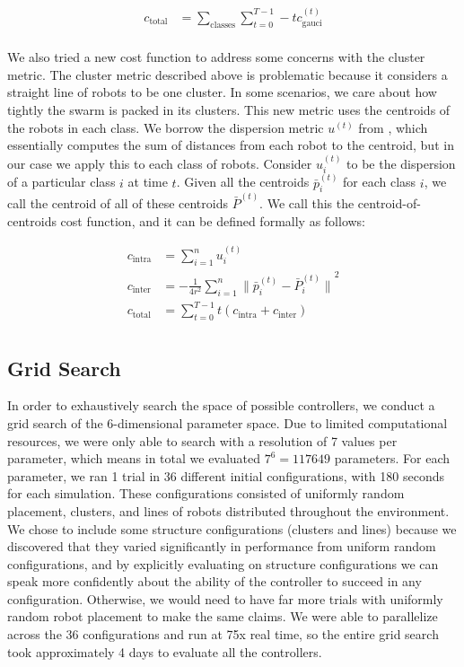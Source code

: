 \documentclass[conference]{IEEEtran}
\begin{document}
    \begin{align*}
      c_{\text{total}} &=  \sum_{\text{classes}}\sum_{t=0}^{T-1} -t c_{\text{gauci}}^{(t)} \\
    \end{align*}

    We also tried a new cost function to address some concerns with the cluster metric. The cluster metric described above is problematic because it considers a straight line of robots to be one cluster. In some scenarios, we care about how tightly the swarm is packed in its clusters. This new metric uses the centroids of the robots in each class. We borrow the dispersion metric $u^{(t)}$ from \cite{gauci_self-organized_2014}, which essentially computes the sum of distances from each robot to the centroid, but in our case we apply this to each class of robots. Consider $u_i^{(t)}$ to be the dispersion of a particular class $i$ at time $t$. Given all the centroids $\bar{p}_i^{(t)}$ for each class $i$, we call the centroid of all of these centroids $\bar{P}^{(t)}$. We call this the centroid-of-centroids cost function, and it can be defined formally as follows:

    \begin{align*}
    c_{\text{intra}} &= \sum_{i=1}^n u_i^{(t)} \\
    c_{\text{inter}} &= -\frac{1} {4r^2}\sum_{i=1}^n{\lVert \bar{p}_i^{(t)} - \bar{P}_i^{(t)} \rVert}^2 \\
    c_{\text{total}} &=  \sum_{t=0}^{T-1} t (c_{\text{intra}} + c_{\text{inter}}) \\
    \end{align*}

  \subsection{Grid Search}

    In order to exhaustively search the space of possible controllers, we conduct a grid search of the 6-dimensional parameter space. Due to limited computational resources, we were only able to search with a resolution of 7 values per parameter, which means in total we evaluated $7^6=117649$ parameters. For each parameter, we ran 1 trial in 36 different initial configurations, with 180 seconds for each simulation. These configurations consisted of uniformly random placement, clusters, and lines of robots distributed throughout the environment. We chose to include some structure configurations (clusters and lines) because we discovered that they varied significantly in performance from uniform random configurations, and by explicitly evaluating on structure configurations we can speak more confidently about the ability of the controller to succeed in any configuration. Otherwise, we would need to have far more trials with uniformly random robot placement to make the same claims. We were able to parallelize across the 36 configurations and run at 75x real time, so the entire grid search took approximately 4 days to evaluate all the controllers.
\end{document}
